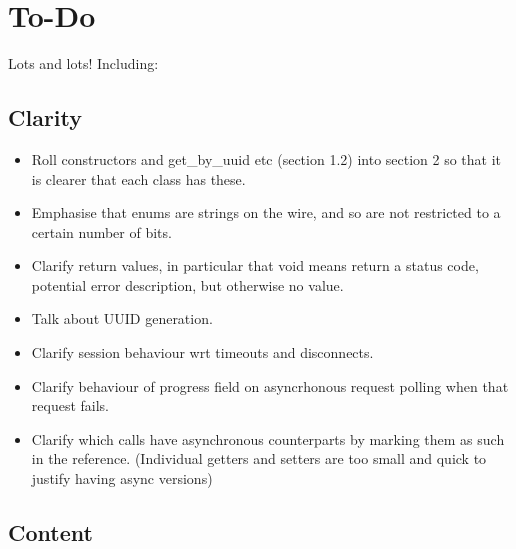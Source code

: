%
%
%
%

\section{To-Do}

Lots and lots! Including:

\subsection{Clarity}

\begin{itemize}

\item Roll constructors and get\_by\_uuid etc (section 1.2) into section 2 so
that it is clearer that each class has these.

\item Emphasise that enums are strings on the wire, and so are not restricted
to a certain number of bits.

\item Clarify return values, in particular that void means return a status
code, potential error description, but otherwise no value.

\item Talk about UUID generation.

\item Clarify session behaviour wrt timeouts and disconnects.

\item Clarify behaviour of progress field on asyncrhonous request polling when
that request fails.

\item Clarify which calls have asynchronous counterparts by marking them as such in the reference. (Individual getters and setters are too small and quick to justify having async versions)

\end{itemize}

\subsection{Content}

